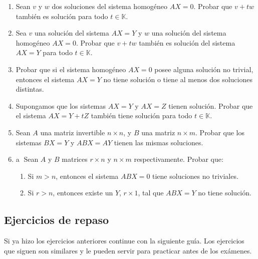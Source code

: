 \begin{enumerate}[topsep=6pt,itemsep=.4cm]
\item\label{sol homog es subesp} Sean  $v$ y $w$ dos soluciones del sistema homogéneo $AX=0$. Probar que $v+tw$ también es solución para todo $t\in\mathbb{K}$.

\item Sea $v$ una solución del sistema $AX=Y$ y $w$ una solución del sistema homogéneo $AX=0$. Probar que $v+tw$ también es solución del sistema $AX=Y$ para todo $t\in\mathbb{K}$.

\item Probar que si el sistema homogéneo  $AX=0$ posee alguna solución no trivial, entonces el sistema $AX=Y$ no tiene
solución o tiene al menos dos soluciones distintas.

\item Supongamos que los sistemas $AX=Y$ y $AX=Z$ tienen solución. Probar que el sistema $AX=Y+tZ$ también tiene solución para todo $t\in\mathbb{K}$.

\item Sean $A$ una matriz invertible $n\times n$, y $B$ una matriz $n\times m$.  Probar que los sistemas $BX=Y$ y $ABX=AY$ tienen las mismas soluciones.

\item\label{ej:sistemas ABX} \textcircled{a}
Sean $A$ y $B$ matrices $r\times n$ y $n\times m$ respectivamente.
Probar que:
\begin{enumerate}[topsep=5pt,itemsep=5pt]
    \item  Si $m>n$, entonces el sistema $ABX=0$ tiene soluciones no triviales.
    \item  Si $r>n$, entonces existe un $Y$, $r\times 1$, tal que $ABX=Y$
    no tiene solución.
\end{enumerate}


\end{enumerate}




\subsection*{Ejercicios de repaso}
Si ya hizo los ejercicios anteriores continue con la siguiente guía. Los ejercicios que siguen son similares y le pueden servir para practicar antes de los exámenes.



